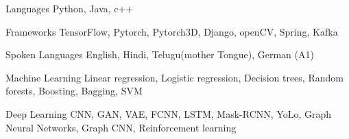 
\begin{cvskills}
  \cvskill
    {Languages} %
    {Python, Java, c++} %

  \cvskill
    {Frameworks} %
    {TensorFlow, Pytorch, Pytorch3D, Django, openCV, Spring, Kafka} %
    
	\cvskill
	{Spoken Languages} %
	{English, Hindi, Telugu(mother Tongue), German (A1)} %
	
	\cvskill
	{Machine Learning} %
	{Linear regression, Logistic regression, Decision trees, Random forests, Boosting, Bagging, SVM} %
	
	\cvskill
	{Deep Learning} %
	{CNN, GAN, VAE, FCNN, LSTM, Mask-RCNN, YoLo, Graph Neural Networks, Graph CNN, Reinforcement learning} %
\end{cvskills}
